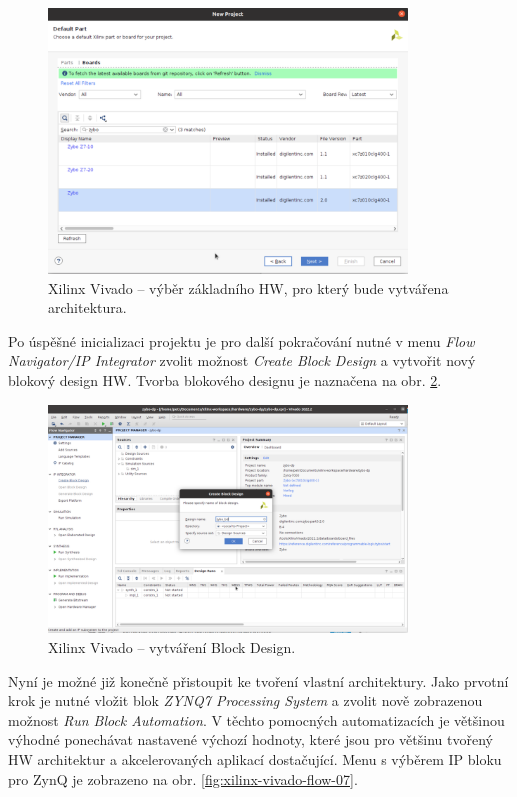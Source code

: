 \documentclass[a4paper, twoside, 11pt]{article}
\begin{document}
		\begin{figure}[htbp!]
			\centering
			\includegraphics[width=0.85\textwidth]{src/png/xilinx-vivado-flow/xilinx-vivado-flow-02.png}
			\caption{Xilinx Vivado – výběr základního HW, pro který bude vytvářena architektura.}
			\label{fig:xilinx-vivado-flow-02}
		\end{figure}
		
		Po úspěšné inicializaci projektu je pro další pokračování nutné v menu \textit{Flow Navigator/IP Integrator} zvolit možnost \textit{Create Block Design} a vytvořit nový blokový design HW. Tvorba blokového designu je naznačena na obr. \ref{fig:xilinx-vivado-flow-05}.
		
		\begin{figure}[htbp!]
			\centering
			\includegraphics[width=0.85\textwidth]{src/png/xilinx-vivado-flow/xilinx-vivado-flow-05.png}
			\caption{Xilinx Vivado – vytváření Block Design.}
			\label{fig:xilinx-vivado-flow-05}
		\end{figure}

		Nyní je možné již konečně přistoupit ke tvoření vlastní architektury. Jako prvotní krok je nutné vložit blok \textit{ZYNQ7 Processing System} a zvolit nově zobrazenou možnost \textit{Run Block Automation}. V těchto pomocných automatizacích je většinou výhodné ponechávat nastavené výchozí hodnoty, které jsou pro většinu tvořený HW architektur a akcelerovaných aplikací dostačující. Menu s výběrem IP bloku pro ZynQ je zobrazeno na obr. \ref{fig:xilinx-vivado-flow-07}.
\end{document}
